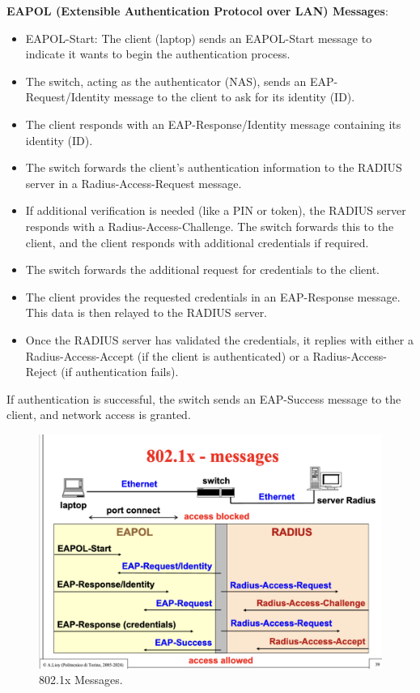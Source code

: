 \hfill 

\textbf{EAPOL (Extensible Authentication Protocol over LAN) Messages}:
\begin{itemize}
    \item EAPOL-Start: The client (laptop) sends an EAPOL-Start message to indicate it wants to begin the authentication process.
    \item The switch, acting as the authenticator (NAS), sends an EAP-Request/Identity message to the client to ask for its identity (ID).
    \item The client responds with an EAP-Response/Identity message containing its identity (ID).
    \item The switch forwards the client's authentication information to the RADIUS server in a Radius-Access-Request message.
    \item If additional verification is needed (like a PIN or token), the RADIUS server responds with a Radius-Access-Challenge. The switch forwards this to the client, and the client responds with additional credentials if required.
    \item The switch forwards the additional request for credentials to the client.
    \item The client provides the requested credentials in an EAP-Response message. This data is then relayed to the RADIUS server.
    \item Once the RADIUS server has validated the credentials, it replies with either a Radius-Access-Accept (if the client is authenticated) or a Radius-Access-Reject (if authentication fails).
\end{itemize}
If authentication is successful, the switch sends an EAP-Success message to the client, and network access is granted.
\begin{figure}[H]
    \centering
    \includegraphics[width=0.5\linewidth]{Images/NetSec/8021x_messages.png}
    \caption{802.1x Messages.}
    \label{fig:8021.x_messages}
\end{figure}

\hfill
\begin{center}
\end{center}

